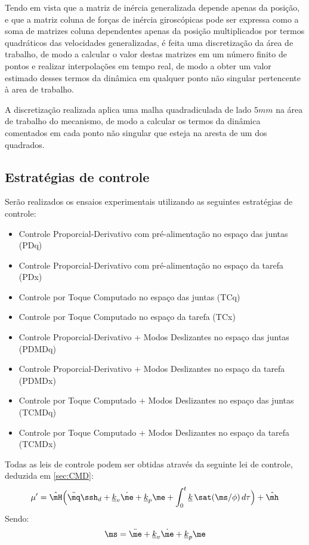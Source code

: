 \documentclass[]{politex}
\begin{document}
Tendo em vista que a matriz de inércia generalizada depende apenas da posição, e que a matriz coluna de forças de inércia giroscópicas pode ser expressa como a soma de matrizes coluna dependentes apenas da posição multiplicados por termos quadráticos das velocidades generalizadas, é feita uma discretização da área de trabalho, de modo a calcular o valor destas matrizes em um número finito de pontos e realizar interpolações em tempo real, de modo a obter um valor estimado desses termos da dinâmica em qualquer ponto não singular pertencente à area de trabalho.

A discretização realizada aplica uma malha quadradiculada de lado $5mm$ na área de trabalho do mecanismo, de modo a calcular os termos da dinâmica comentados em cada ponto não singular que esteja na aresta de um dos quadrados.

\subsection{Estratégias de controle}

Serão realizados os ensaios experimentais utilizando as seguintes estratégias de controle:

\begin{itemize}
\item Controle Proporcial-Derivativo com pré-alimentação no espaço das juntas (PDq)
\item Controle Proporcial-Derivativo com pré-alimentação no espaço da tarefa (PDx)
\item Controle por Toque Computado no espaço das juntas (TCq)
\item Controle por Toque Computado no espaço da tarefa (TCx)
\item Controle Proporcial-Derivativo + Modos Deslizantes no espaço das juntas (PDMDq)
\item Controle Proporcial-Derivativo + Modos Deslizantes no espaço da tarefa (PDMDx)
\item Controle por Toque Computado + Modos Deslizantes no espaço das juntas (TCMDq)
\item Controle por Toque Computado + Modos Deslizantes no espaço da tarefa (TCMDx)
\end{itemize}

Todas as leis de controle podem ser obtidas através da seguinte lei de controle, deduzida em \ref{sec:CMD}:
\begin{equation}
\mu' = \hat{\mH} \Big(\ddot{\mq}\ssh_d + \underline{k}_v \dot{\me} + \underline{k}_p \me + \int_0^t \underline{k} \, \sat(\ms/\phi)\,d \tau \Big) + \hat{\mh}
\end{equation}
Sendo:
\begin{equation}
\ms = \ddot{\me} + \underline{k}_v \dot{\me} + \underline{k}_p \me
\end{equation}
\end{document}
